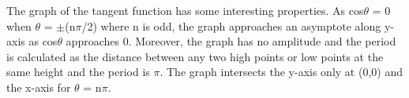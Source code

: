 \documentclass[12pt]{article}
\begin{document}
    The graph of the tangent function has some interesting properties. As cos$\theta$ = 0 when $\theta$ = $\pm$(n$\pi$/2) where n is odd, the graph approaches an asymptote along y-axis as cos$\theta$ approaches 0. Moreover, the graph has no amplitude and the period is calculated as the distance between any two high points or low points at the same height and the period is $\pi$. The graph intersects the y-axis only at (0,0) and the x-axis for $\theta$ = n$\pi$.
    
    
    
\end{document}
